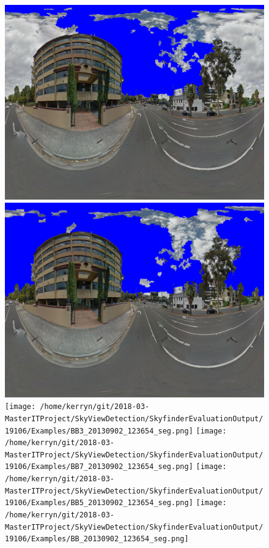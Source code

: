 \documentclass{article}
\begin{document}
\begin{figure}
\includegraphics[scale=0.08]{Images/mean/4880_5_7_210_ms_sky_mark.png} 
\includegraphics[scale=0.08]{Images/mean/4880_7_8_300_ms_sky_mark.png} 
\\
\texttt{[image: /home/kerryn/git/2018-03-MasterITProject/SkyViewDetection/SkyfinderEvaluationOutput/19106/Examples/BB3\_20130902\_123654\_seg.png]} \hfil
\texttt{[image: /home/kerryn/git/2018-03-MasterITProject/SkyViewDetection/SkyfinderEvaluationOutput/19106/Examples/BB7\_20130902\_123654\_seg.png]} \hfil
\texttt{[image: /home/kerryn/git/2018-03-MasterITProject/SkyViewDetection/SkyfinderEvaluationOutput/19106/Examples/BB5\_20130902\_123654\_seg.png]} \hfil
\texttt{[image: /home/kerryn/git/2018-03-MasterITProject/SkyViewDetection/SkyfinderEvaluationOutput/19106/Examples/BB\_20130902\_123654\_seg.png]} 

\end{figure}
\end{document}
